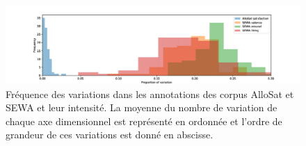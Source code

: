 \begin{figure}[thb]
  \centering
    \includegraphics[width=18cm]{./Chapitre5/figures/variation.jpeg}
    \caption{Fréquence des variations dans les annotations des corpus AlloSat et SEWA et leur intensité. La moyenne du nombre de variation de chaque axe dimensionnel est représenté en ordonnée et l'ordre de grandeur de ces variations est donné en abscisse.}
    \label{fig:variationAnnot}
\end{figure}
